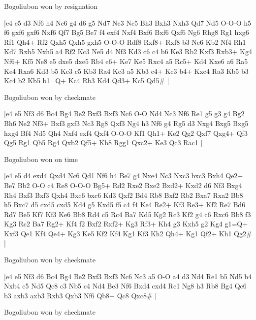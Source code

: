 \showboard

Bogoliubon won by resignation

\makegametitle
|e4 e5 d3 Nf6 h4 Nc6 g4 d6 g5 Nd7 Nc3 Nc5 Bh3 Bxh3 Nxh3 Qd7 Nd5 O-O-O h5 f6 gxf6 gxf6 Nxf6 Qf7 Bg5 Be7 f4 exf4 Nxf4 Bxf6 Bxf6 Qxf6 Ng6 Rhg8 Rg1 hxg6 Rf1 Qh4+ Rf2 Qxh5 Qxh5 gxh5 O-O-O Rdf8 Rxf8+ Rxf8 b3 Ne6 Kb2 Nf4 Rh1 Kd7 Rxh5 Nxh5 a4 Rf2 Kc3 Ne5 d4 Nf3 Kd3 c6 c4 b6 Ke3 Rb2 Kxf3 Rxb3+ Kg4 Nf6+ Kf5 Ne8 e5 dxe5 dxe5 Rb4 e6+ Ke7 Ke5 Rxc4 a5 Rc5+ Kd4 Kxe6 a6 Ra5 Ke4 Rxa6 Kd3 b5 Kc3 c5 Kb3 Ra4 Kc3 a5 Kb3 c4+ Kc3 b4+ Kxc4 Ra3 Kb5 b3 Kc4 b2 Kb5 b1=Q+ Kc4 Rb3 Kd4 Qd3+ Kc5 Qd5\#  |

\showboard

Bogoliubon won by checkmate

\makegametitle
|e4 e5 Nf3 d6 Bc4 Bg4 Be2 Bxf3 Bxf3 Nc6 O-O Nd4 Nc3 Nf6 Re1 g5 g3 g4 Bg2 Bh6 Ne2 Nf3+ Bxf3 gxf3 Nc3 Rg8 Qxf3 Ng4 h3 Nf6 g4 Rg5 d3 Nxg4 Bxg5 Bxg5 hxg4 Bf4 Nd5 Qh4 Nxf4 exf4 Qxf4 O-O-O Kf1 Qh1+ Ke2 Qg2 Qxf7 Qxg4+ Qf3 Qg5 Rg1 Qb5 Rg4 Qxb2 Qf5+ Kb8 Rgg1 Qxc2+ Ke3 Qc3 Rac1  |

\showboard

Bogoliubon won on time

\makegametitle
|e4 e5 d4 exd4 Qxd4 Nc6 Qd1 Nf6 h4 Be7 g4 Nxe4 Nc3 Nxc3 bxc3 Bxh4 Qe2+ Be7 Bb2 O-O c4 Re8 O-O-O Bg5+ Rd2 Rxe2 Bxe2 Bxd2+ Kxd2 d6 Nf3 Bxg4 Rh4 Bxf3 Bxf3 Qxh4 Bxc6 bxc6 Kd3 Qxf2 Bd4 Rb8 Bxf2 Rb2 Bxa7 Rxa2 Bb8 h5 Bxc7 d5 cxd5 cxd5 Kd4 g5 Kxd5 f5 c4 f4 Ke4 Re2+ Kf3 Re3+ Kf2 Re7 Bd6 Rd7 Be5 Kf7 Kf3 Ke6 Bb8 Rd4 c5 Rc4 Ba7 Kd5 Kg2 Rc3 Kf2 g4 c6 Rxc6 Bb8 f3 Kg3 Rc2 Ba7 Rg2+ Kf4 f2 Bxf2 Rxf2+ Kg3 Rf3+ Kh4 g3 Kxh5 g2 Kg4 g1=Q+ Kxf3 Qe1 Kf4 Qe4+ Kg3 Ke5 Kf2 Kf4 Kg1 Kf3 Kh2 Qh4+ Kg1 Qf2+ Kh1 Qg2\#  |

\showboard

Bogoliubon won by checkmate

\makegametitle
|e4 e5 Nf3 d6 Bc4 Bg4 Be2 Bxf3 Bxf3 Nc6 Nc3 a5 O-O a4 d3 Nd4 Re1 b5 Nd5 b4 Nxb4 c5 Nd5 Qc8 c3 Nb5 c4 Nd4 Be3 Nf6 Bxd4 cxd4 Rc1 Ng8 h3 Rb8 Bg4 Qc6 b3 axb3 axb3 Rxb3 Qxb3 Nf6 Qb8+ Qc8 Qxc8\#  |

\showboard

Bogoliubon won by checkmate

